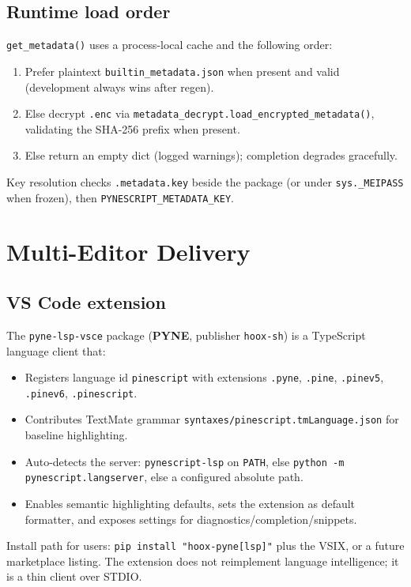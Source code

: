 \documentclass[11pt,a4paper]{article}
\begin{document}
\subsection{Runtime load order}
\label{sec:meta-load}

\texttt{get\_metadata()} uses a process-local cache and the following order:
\begin{enumerate}[leftmargin=*]
  \item Prefer plaintext \texttt{builtin\_metadata.json} when present and valid
        (development always wins after regen).
  \item Else decrypt \texttt{.enc} via \texttt{metadata\_decrypt.load\_encrypted\_metadata()},
        validating the SHA-256 prefix when present.
  \item Else return an empty dict (logged warnings); completion degrades gracefully.
\end{enumerate}
Key resolution checks \texttt{.metadata.key} beside the package (or under
\texttt{sys.\_MEIPASS} when frozen), then \texttt{PYNESCRIPT\_METADATA\_KEY}.

\section{Multi-Editor Delivery}
\label{sec:editors}

\subsection{VS Code extension}
\label{sec:vscode}

The \texttt{pyne-lsp-vsce} package (\textbf{PYNE}, publisher
\texttt{hoox-sh}) is a TypeScript language client that:
\begin{itemize}[leftmargin=*]
  \item Registers language id \texttt{pinescript} with extensions \texttt{.pyne},
        \texttt{.pine}, \texttt{.pinev5}, \texttt{.pinev6}, \texttt{.pinescript}.
  \item Contributes TextMate grammar \texttt{syntaxes/pinescript.tmLanguage.json}
        for baseline highlighting.
  \item Auto-detects the server: \texttt{pynescript-lsp} on \texttt{PATH}, else
        \texttt{python -m pynescript.langserver}, else a configured absolute path.
  \item Enables semantic highlighting defaults, sets the extension as default
        formatter, and exposes settings for diagnostics/completion/snippets.
\end{itemize}
Install path for users: \texttt{pip install "hoox-pyne[lsp]"} plus the VSIX, or a
future marketplace listing. The extension does not reimplement language intelligence;
it is a thin client over STDIO.
\end{document}
